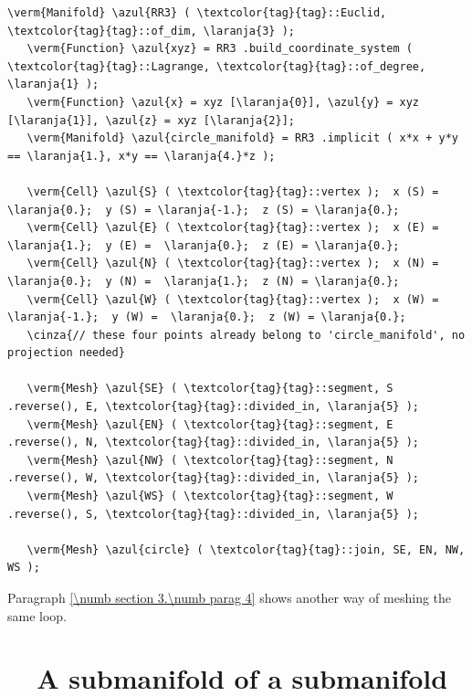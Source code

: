 \begin{Verbatim}[commandchars=\\\{\},formatcom=\small\tt,frame=single,
   label=parag-\ref{\numb section 2.\numb parag 12}.cpp,rulecolor=\color{coment},
   baselinestretch=0.94,framesep=2mm]
   \verm{Manifold} \azul{RR3} ( \textcolor{tag}{tag}::Euclid, \textcolor{tag}{tag}::of_dim, \laranja{3} );
   \verm{Function} \azul{xyz} = RR3 .build_coordinate_system ( \textcolor{tag}{tag}::Lagrange, \textcolor{tag}{tag}::of_degree, \laranja{1} );
   \verm{Function} \azul{x} = xyz [\laranja{0}], \azul{y} = xyz [\laranja{1}], \azul{z} = xyz [\laranja{2}];
   \verm{Manifold} \azul{circle_manifold} = RR3 .implicit ( x*x + y*y == \laranja{1.}, x*y == \laranja{4.}*z );

   \verm{Cell} \azul{S} ( \textcolor{tag}{tag}::vertex );  x (S) =  \laranja{0.};  y (S) = \laranja{-1.};  z (S) = \laranja{0.};
   \verm{Cell} \azul{E} ( \textcolor{tag}{tag}::vertex );  x (E) =  \laranja{1.};  y (E) =  \laranja{0.};  z (E) = \laranja{0.};
   \verm{Cell} \azul{N} ( \textcolor{tag}{tag}::vertex );  x (N) =  \laranja{0.};  y (N) =  \laranja{1.};  z (N) = \laranja{0.};
   \verm{Cell} \azul{W} ( \textcolor{tag}{tag}::vertex );  x (W) = \laranja{-1.};  y (W) =  \laranja{0.};  z (W) = \laranja{0.};
   \cinza{// these four points already belong to 'circle_manifold', no projection needed}

   \verm{Mesh} \azul{SE} ( \textcolor{tag}{tag}::segment, S .reverse(), E, \textcolor{tag}{tag}::divided_in, \laranja{5} );
   \verm{Mesh} \azul{EN} ( \textcolor{tag}{tag}::segment, E .reverse(), N, \textcolor{tag}{tag}::divided_in, \laranja{5} );
   \verm{Mesh} \azul{NW} ( \textcolor{tag}{tag}::segment, N .reverse(), W, \textcolor{tag}{tag}::divided_in, \laranja{5} );
   \verm{Mesh} \azul{WS} ( \textcolor{tag}{tag}::segment, W .reverse(), S, \textcolor{tag}{tag}::divided_in, \laranja{5} );

   \verm{Mesh} \azul{circle} ( \textcolor{tag}{tag}::join, SE, EN, NW, WS );
\end{Verbatim}

Paragraph \ref{\numb section 3.\numb parag 4} shows another way of meshing the same loop.


\section{~~A submanifold of a submanifold}\label{\numb section 2.\numb parag 13}

